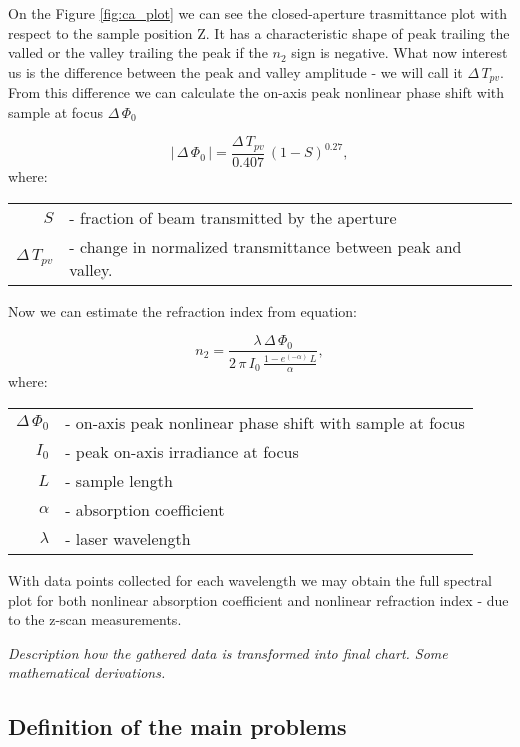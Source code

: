 \documentclass[12pt,twoside,a4paper]{article}
\numberwithin{equation}{subsection}
\numberwithin{figure}{subsection}
\begin{document}
On the Figure \ref{fig:ca_plot} we can see the closed-aperture trasmittance plot with respect to the sample position Z. It has a
characteristic shape of peak trailing the valled or the valley trailing the peak if the ${n_{2}}$ sign is negative. What now
interest us is the difference between the peak and valley amplitude - we will call it $\Delta \,{T_{pv}}$. From this difference we
can calculate the on-axis peak nonlinear phase shift with sample at focus $\Delta \,{\Phi_{0}}$

\begin{equation} \label{eq:nlo_onaxisshift}
  \left| \! \,\Delta \,{\Phi_{0}}\, \!  \right| =\frac {\Delta \,{T_{pv}}}{0.407}\,(1 - S)^{0.27},
\end{equation}
where: 
\begin{tabular}{ r l}
  $S$ & - fraction of beam transmitted by the aperture \\
  $\Delta \,{T_{pv}}$ & - change in normalized transmittance between peak and valley. \\ 
\end{tabular}
Now we can estimate the refraction index from equation:

\begin{equation} \label{eq:nlo_estrefindex}
  {n_{2}}=\frac {\lambda \,\Delta \,{\Phi_{0}}}{2\,\pi \,{I_{0}}\,\frac {1 - e^{( - \alpha )}\,L}{\alpha }},
\end{equation}
where: 
\begin{tabular}{ r l}
  $\Delta \,{\Phi_{0}}$ & - on-axis peak nonlinear phase shift with sample at focus \\
  ${I_{0}}$  & - peak on-axis irradiance at focus \\
  $L$ & - sample length \\
  $\alpha $ & - absorption coefficient \\
  $\lambda $  & - laser wavelength \\
\end{tabular}

With data points collected for each wavelength we may obtain the full spectral plot for both nonlinear absorption coefficient and
nonlinear refraction index - due to the z-scan measurements.

\textit{Description how the gathered data is transformed into final chart. Some mathematical derivations.}

\subsection{Definition of the main problems} \label{chap:zscan_problems}
\end{document}
